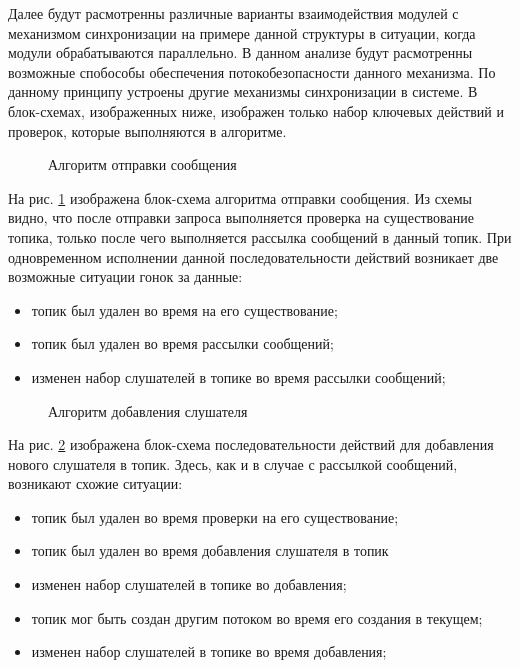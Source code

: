 Далее будут расмотренны различные варианты взаимодействия модулей с механизмом синхронизации на примере данной структуры в ситуации, когда модули обрабатываются параллельно. В данном анализе будут расмотренны возможные спобособы обеспечения потокобезопасности данного механизма. По данному принципу устроены другие механизмы синхронизации в системе. В блок-схемах, изображенных ниже, изображен только набор ключевых действий и проверок, которые выполняются в алгоритме. 

\begin{figure}[h]
	\caption{Алгоритм отправки сообщения}
	\label{im:2_2_5_send_message}
\end{figure}

На рис. \ref{im:2_2_5_send_message} изображена блок-схема алгоритма отправки сообщения. Из схемы видно, что после отправки запроса выполняется проверка на существование топика, только после чего выполняется рассылка сообщений в данный топик. При одновременном исполнении данной последовательности  действий возникает две возможные ситуации гонок за данные:

\begin{itemize}  
	\item топик был удален во время на его существование;
	\item топик был удален во время рассылки сообщений;
	\item изменен набор слушателей в топике во время рассылки сообщений;
\end{itemize}

\begin{figure}[h]
	\caption{Алгоритм добавления слушателя}
	\label{im:2_2_4_add_listener}
\end{figure}


На рис. \ref{im:2_2_4_add_listener} изображена блок-схема последовательности действий для добавления нового слушателя в топик. Здесь, как и в случае с рассылкой сообщений, возникают схожие ситуации:

\begin{itemize}  
	\item топик был удален во время проверки на его существование;
	\item топик был удален во время добавления слушателя в топик
	\item изменен набор слушателей в топике во добавления;
	\item топик мог быть создан другим потоком во время его создания в текущем;
	\item изменен набор слушателей в топике во время добавления;
\end{itemize}

